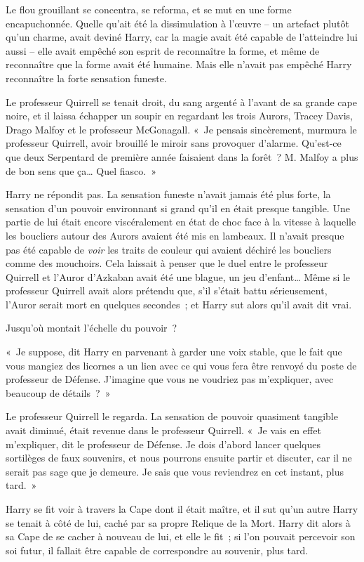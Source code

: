 Le flou grouillant se concentra, se reforma, et se mut en une forme encapuchonnée.
Quelle qu'ait été la dissimulation à l'œuvre -- un artefact plutôt qu'un charme, avait deviné Harry, car la magie avait été capable de l'atteindre lui aussi -- elle avait empêché son esprit de reconnaître la forme, et même de reconnaître que la forme avait été humaine.
Mais elle n'avait pas empêché Harry reconnaître la forte sensation funeste.

Le professeur Quirrell se tenait droit, du sang argenté à l'avant de sa grande cape noire, et il laissa échapper un soupir en regardant les trois Aurors, Tracey Davis, Drago Malfoy et le professeur McGonagall.
«~Je pensais sincèrement, murmura le professeur Quirrell, avoir brouillé le miroir sans provoquer d'alarme.
Qu'est-ce que deux Serpentard de première année faisaient dans la forêt~?
M. Malfoy a plus de bon sens que ça…
Quel fiasco.~»

Harry ne répondit pas.
La sensation funeste n'avait jamais été plus forte, la sensation d'un pouvoir environnant si grand qu'il en était presque tangible.
Une partie de lui était encore viscéralement en état de choc face à la vitesse à laquelle les boucliers autour des Aurors avaient été mis en lambeaux.
Il n'avait presque pas été capable de \emph{voir} les traits de couleur qui avaient déchiré les boucliers comme des mouchoirs.
Cela laissait à penser que le duel entre le professeur Quirrell et l'Auror d'Azkaban avait été une blague, un jeu d'enfant…
Même si le professeur Quirrell avait alors prétendu que, s'il s'était battu sérieusement, l'Auror serait mort en quelques secondes~; et Harry sut alors qu'il avait dit vrai.

Jusqu'où montait l'échelle du pouvoir~?

«~Je suppose, dit Harry en parvenant à garder une voix stable, que le fait que vous mangiez des licornes a un lien avec ce qui vous fera être renvoyé du poste de professeur de Défense.
J'imagine que vous ne voudriez pas m'expliquer, avec beaucoup de détails~?~»

Le professeur Quirrell le regarda.
La sensation de pouvoir quasiment tangible avait diminué, était revenue dans le professeur Quirrell.
«~Je vais en effet m'expliquer, dit le professeur de Défense.
Je dois d'abord lancer quelques sortilèges de faux souvenirs, et nous pourrons ensuite partir et discuter, car il ne serait pas sage que je demeure.
Je sais que vous reviendrez en cet instant, plus tard.~»

Harry se fit voir à travers la Cape dont il était maître, et il sut qu'un autre Harry se tenait à côté de lui, caché par sa propre Relique de la Mort.
Harry dit alors à sa Cape de se cacher à nouveau de lui, et elle le fit~; si l'on pouvait percevoir son soi futur, il fallait être capable de correspondre au souvenir, plus tard.

